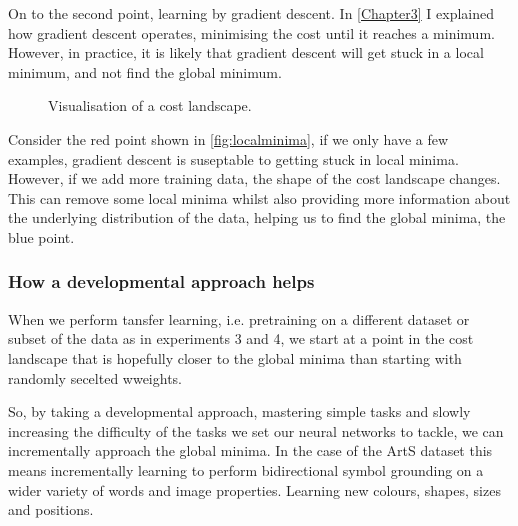 On to the second point, learning by gradient descent. In \autoref{Chapter3} I explained how gradient descent operates, minimising the cost until it reaches a minimum. However, in practice, it is likely that gradient descent will get stuck in a local minimum, and not find the global minimum. 

\begin{figure}
\begin{center}
\caption{Visualisation of a cost landscape.}
\label{fig:localminima}
\end{center}
\end{figure}

Consider the red point shown in \autoref{fig:localminima}, if we only have a few examples, gradient descent is suseptable to getting stuck in local minima. However, if we add more training data, the shape of the cost landscape changes. This can remove some local minima whilst also providing more information about the underlying distribution of the data, helping us to find the global minima, the blue point.

\subsubsection{How a developmental approach helps}
When we perform tansfer learning, i.e. pretraining on a different dataset or subset of the data as in experiments 3 and 4, we start at a point in the cost landscape that is hopefully closer to the global minima than starting with randomly secelted wweights.

So, by taking a developmental approach, mastering simple tasks and slowly increasing the difficulty of the tasks we set our neural networks to tackle, we can incrementally approach the global minima. In the case of the ArtS dataset this means incrementally learning to perform bidirectional symbol grounding on a wider variety of words and image properties. Learning new colours, shapes, sizes and positions.